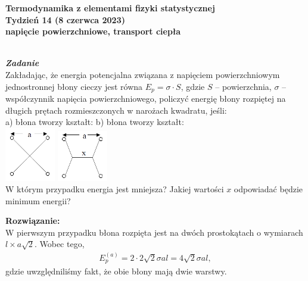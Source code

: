 \documentclass[11pt,a4paper]{article}
\newcounter{zadanie}\newcommand{\zadanie}[1][]{\addtocounter{zadanie}{1} ~\\  {\bf \emph{Zadanie \arabic{zadanie} #1 }} \\}
\begin{document}
\begin{centering}

\vspace*{-1cm}

\bf{\Large{Termodynamika z elementami fizyki statystycznej}}\\
Tydzień 14 (8 czerwca 2023)\\[5mm]
napięcie powierzchniowe, transport ciepła\\
\end{centering} 

\vspace*{0mm}
\zadanie
Zakładając, że energia potencjalna związana z napięciem powierzchniowym jednostronnej błony cieczy jest
równa $E_p = \sigma \cdot S$, gdzie $S$ – powierzchnia, $\sigma$ – współczynnik napięcia
powierzchniowego, policzyć energię błony rozpiętej na długich prętach rozmieszczonych
w narożach kwadratu, jeśli:\\[1mm]
\hspace*{10ex} a) błona tworzy kształt:
\hspace*{20ex} b) błona tworzy kształt: \\
\hspace*{13ex}\includegraphics[width=22mm]{blona1.png}
\hspace*{32ex}\includegraphics[width=22mm]{blona2.png}
\\
W którym przypadku energia jest mniejsza? Jakiej wartości $x$ odpowiadać będzie minimum energii?

\vspace{0.2cm}
\textbf{Rozwiązanie:}\\
W pierwszym przypadku błona rozpięta jest na dwóch prostokątach o wymiarach $ l \times a\sqrt{2}$. Wobec tego,
\begin{align*}
E_{p}^{(a)}= 2 \cdot 2 \sqrt{2}\sigma a l = 4 \sqrt{2}\sigma a l,
\end{align*}
gdzie uwzględniliśmy fakt, że obie błony mają dwie warstwy.
\end{document}
